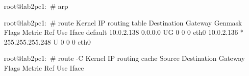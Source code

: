 root@lab2pc1:~# arp


root@lab2pc1:~# route
Kernel IP routing table
Destination     Gateway         Genmask         Flags Metric Ref    Use Iface
default         10.0.2.138      0.0.0.0         UG    0      0        0 eth0
10.0.2.136      *               255.255.255.248 U     0      0        0 eth0


root@lab2pc1:~# route -C
Kernel IP routing cache
Source          Destination     Gateway         Flags Metric Ref    Use Iface
